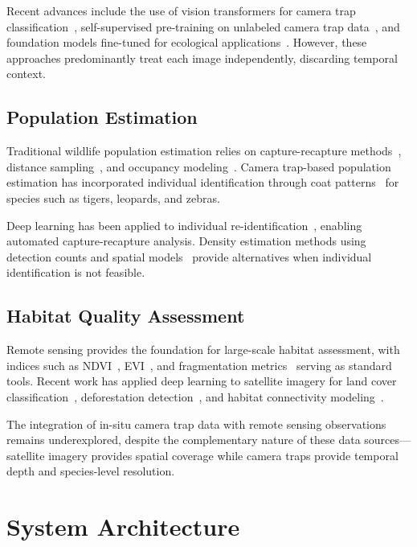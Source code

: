\documentclass[11pt,letterpaper]{article}
\begin{document}
Recent advances include the use of vision transformers for camera trap classification~\cite{dosovitskiy2021}, self-supervised pre-training on unlabeled camera trap data~\cite{pantazis2021}, and foundation models fine-tuned for ecological applications~\cite{weinstein2022}. However, these approaches predominantly treat each image independently, discarding temporal context.

\subsection{Population Estimation}

Traditional wildlife population estimation relies on capture-recapture methods~\cite{jolly1965, seber1965}, distance sampling~\cite{buckland2001}, and occupancy modeling~\cite{mackenzie2002}. Camera trap-based population estimation has incorporated individual identification through coat patterns~\cite{karanth1998} for species such as tigers, leopards, and zebras.

Deep learning has been applied to individual re-identification~\cite{schneider2020}, enabling automated capture-recapture analysis. Density estimation methods using detection counts and spatial models~\cite{chandler2011} provide alternatives when individual identification is not feasible.

\subsection{Habitat Quality Assessment}

Remote sensing provides the foundation for large-scale habitat assessment, with indices such as NDVI~\cite{tucker1979}, EVI~\cite{huete2002}, and fragmentation metrics~\cite{mcgarigal2012} serving as standard tools. Recent work has applied deep learning to satellite imagery for land cover classification~\cite{helber2019}, deforestation detection~\cite{ortega2021}, and habitat connectivity modeling~\cite{mcrae2008}.

The integration of in-situ camera trap data with remote sensing observations remains underexplored, despite the complementary nature of these data sources---satellite imagery provides spatial coverage while camera traps provide temporal depth and species-level resolution.

\section{System Architecture}
\end{document}
